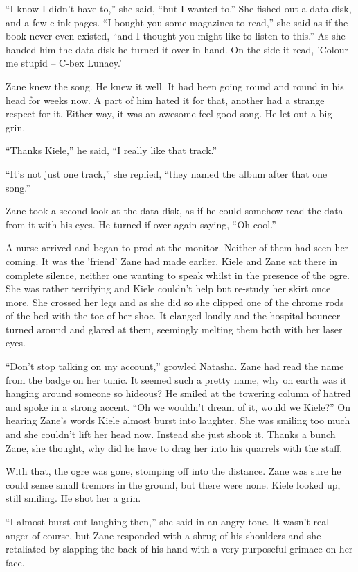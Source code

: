 ``I know I didn't have to,'' she said, ``but I wanted to.''  She fished out a data disk, and a few e-ink pages.  ``I bought you some magazines to read,'' she said as if the book never even existed, ``and I thought you might like to listen to this.''  As she handed him the data disk he turned it over in hand.  On the side it read, 'Colour me stupid – C-bex Lunacy.'

Zane knew the song.  He knew it well.  It had been going round and round in his head for weeks now.  A part of him hated it for that, another had a strange respect for it.  Either way, it was an awesome feel good song.  He let out a big grin.

``Thanks Kiele,'' he said, ``I really like that track.''

``It's not just one track,'' she replied, ``they named the album after that one song.''

Zane took a second look at the data disk, as if he could somehow read the data from it with his eyes.  He turned if over again saying, ``Oh cool.''

A nurse arrived and began to prod at the monitor.  Neither of them had seen her coming.  It was the 'friend' Zane had made earlier.  Kiele and Zane sat there in complete silence, neither one wanting to speak whilst in the presence of the ogre.  She was rather terrifying and Kiele couldn't help but re-study her skirt once more.  She crossed her legs and as she did so she clipped one of the chrome rods of the bed with the toe of her shoe.  It clanged loudly and the hospital bouncer turned around and glared at them, seemingly melting them both with her laser eyes.

``Don't stop talking on my account,'' growled Natasha.  Zane had read the name from the badge on her tunic.  It seemed such a pretty name, why on earth was it hanging around someone so hideous?  He smiled at the towering column of hatred and spoke in a strong accent.  ``Oh we wouldn't dream of it, would we Kiele?''  On hearing Zane's words Kiele almost burst into laughter.  She was smiling too much and she couldn't lift her head now.  Instead she just shook it.  Thanks a bunch Zane, she thought, why did he have to drag her into his quarrels with the staff.

With that, the ogre was gone, stomping off into the distance.  Zane was sure he could sense small tremors in the ground, but there were none.  Kiele looked up, still smiling.  He shot her a grin.

``I almost burst out laughing then,'' she said in an angry tone.  It wasn't real anger of course, but Zane responded with a shrug of his shoulders and she retaliated by slapping the back of his hand with a very purposeful grimace on her face.

